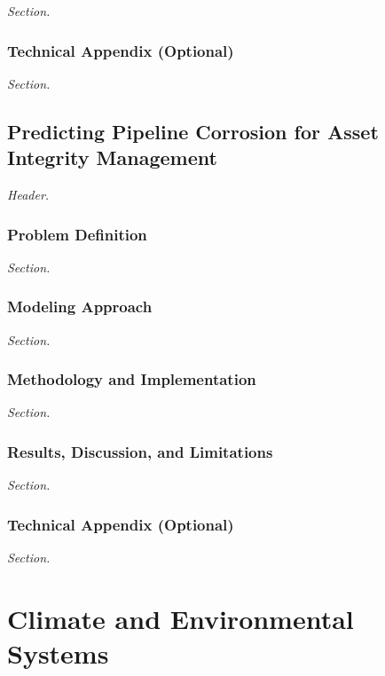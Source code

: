 \documentclass[
  12pt,
  letterpaper,
]{book}
\begin{document}
\emph{Section.}

\section{Technical Appendix
(Optional)}\label{technical-appendix-optional-7}

\emph{Section.}

\chapter{Predicting Pipeline Corrosion for Asset Integrity
Management}\label{predicting-pipeline-corrosion-for-asset-integrity-management}

\emph{Header.}

\section{Problem Definition}\label{problem-definition-9}

\emph{Section.}

\section{Modeling Approach}\label{modeling-approach-9}

\emph{Section.}

\section{Methodology and
Implementation}\label{methodology-and-implementation-9}

\emph{Section.}

\section{Results, Discussion, and
Limitations}\label{results-discussion-and-limitations-9}

\emph{Section.}

\section{Technical Appendix
(Optional)}\label{technical-appendix-optional-8}

\emph{Section.}

\part{Climate and Environmental Systems}
\end{document}
